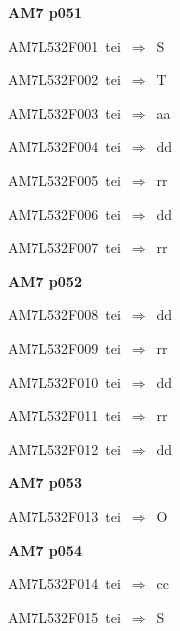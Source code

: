 \par\vfill\eject
{\bf\hfill AM7 p051\hfill\hbox{}}\par\bigskip
{\sixrm AM7L532F001\ {\sixit tei}\ }$\Rightarrow$\ S\par\smallskip
{\sixrm AM7L532F002\ {\sixit tei}\ }$\Rightarrow$\ T\par\smallskip
{\sixrm AM7L532F003\ {\sixit tei}\ }$\Rightarrow$\ {\tenit aa}\par\smallskip
{\sixrm AM7L532F004\ {\sixit tei}\ }$\Rightarrow$\ {\tenit dd}\par\smallskip
{\sixrm AM7L532F005\ {\sixit tei}\ }$\Rightarrow$\ {\tenit rr}\par\smallskip
{\sixrm AM7L532F006\ {\sixit tei}\ }$\Rightarrow$\ {\tenit dd}\par\smallskip
{\sixrm AM7L532F007\ {\sixit tei}\ }$\Rightarrow$\ {\tenit rr}\par\smallskip

\par\vfill\eject
{\bf\hfill AM7 p052\hfill\hbox{}}\par\bigskip
{\sixrm AM7L532F008\ {\sixit tei}\ }$\Rightarrow$\ {\tenit dd}\par\smallskip
{\sixrm AM7L532F009\ {\sixit tei}\ }$\Rightarrow$\ {\tenit rr}\par\smallskip
{\sixrm AM7L532F010\ {\sixit tei}\ }$\Rightarrow$\ {\tenit dd}\par\smallskip
{\sixrm AM7L532F011\ {\sixit tei}\ }$\Rightarrow$\ {\tenit rr}\par\smallskip
{\sixrm AM7L532F012\ {\sixit tei}\ }$\Rightarrow$\ {\tenit dd}\par\smallskip

\par\vfill\eject
{\bf\hfill AM7 p053\hfill\hbox{}}\par\bigskip
{\sixrm AM7L532F013\ {\sixit tei}\ }$\Rightarrow$\ O\par\smallskip

\par\vfill\eject
{\bf\hfill AM7 p054\hfill\hbox{}}\par\bigskip
{\sixrm AM7L532F014\ {\sixit tei}\ }$\Rightarrow$\ {\tenit cc}\par\smallskip
{\sixrm AM7L532F015\ {\sixit tei}\ }$\Rightarrow$\ S\par\smallskip

